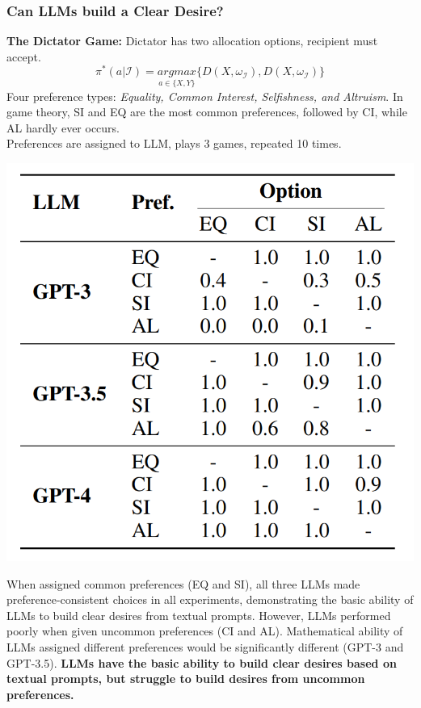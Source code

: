 \documentclass[12pt]{article}
\begin{document}
\subsubsection*{Can LLMs build a Clear Desire?}
\textbf{The Dictator Game:} Dictator has two allocation options, recipient must accept.
\[\pi^*(a|\mathcal{I})=\underset{a\in\{X,Y\}}{argmax}\{D(X,\omega_{\mathcal{I}}), D(X,\omega_{\mathcal{I}})\}\]
Four preference types: \textit{Equality, Common Interest, Selfishness, and Altruism}. In game theory, SI and EQ are the most common preferences, followed by CI, while AL hardly
ever occurs.\\
Preferences are assigned to LLM, plays 3 games, repeated 10 times.\\
\begin{center}
  \includegraphics*{tabl1.png}
\end{center}
When assigned common preferences (EQ and SI), all
three LLMs made preference-consistent choices in all experiments, demonstrating the basic ability of LLMs to build
clear desires from textual prompts. However, LLMs performed poorly when given uncommon preferences (CI and
AL). Mathematical ability of LLMs assigned different preferences would be significantly different (GPT-3 and GPT-3.5). \textbf{LLMs have the basic ability to build clear desires based on textual prompts, but struggle to build desires from uncommon preferences.}
\end{document}
